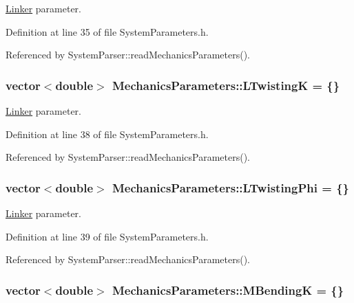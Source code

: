 \hyperlink{classLinker}{Linker} parameter. 



Definition at line 35 of file System\+Parameters.\+h.



Referenced by System\+Parser\+::read\+Mechanics\+Parameters().

\hypertarget{structMechanicsParameters_a6629c1138e0a0662f6156fe67431f690}{
\subsubsection[{L\+Twisting\+K}]{\setlength{\rightskip}{0pt plus 5cm}vector$<$double$>$ Mechanics\+Parameters\+::\+L\+Twisting\+K = \{\}}}\label{structMechanicsParameters_a6629c1138e0a0662f6156fe67431f690}


\hyperlink{classLinker}{Linker} parameter. 



Definition at line 38 of file System\+Parameters.\+h.



Referenced by System\+Parser\+::read\+Mechanics\+Parameters().

\hypertarget{structMechanicsParameters_a8cc146be39259d4b1edd94b70d9b1832}{
\subsubsection[{L\+Twisting\+Phi}]{\setlength{\rightskip}{0pt plus 5cm}vector$<$double$>$ Mechanics\+Parameters\+::\+L\+Twisting\+Phi = \{\}}}\label{structMechanicsParameters_a8cc146be39259d4b1edd94b70d9b1832}


\hyperlink{classLinker}{Linker} parameter. 



Definition at line 39 of file System\+Parameters.\+h.



Referenced by System\+Parser\+::read\+Mechanics\+Parameters().

\hypertarget{structMechanicsParameters_abbc374692e6df3c7532e085918a98c4c}{
\subsubsection[{M\+Bending\+K}]{\setlength{\rightskip}{0pt plus 5cm}vector$<$double$>$ Mechanics\+Parameters\+::\+M\+Bending\+K = \{\}}}\label{structMechanicsParameters_abbc374692e6df3c7532e085918a98c4c}


